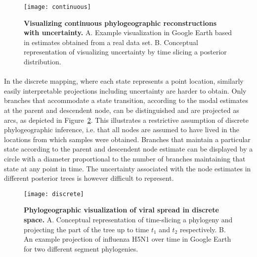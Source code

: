 \begin{figure}[h!]
\centering
\texttt{[image: continuous]}
\caption{
{ \footnotesize 
{\bf Visualizing continuous phylogeographic reconstructions with uncertainty.} 
A. Example visualization in Google Earth based in estimates obtained from a real data set. B. Conceptual representation of visualizing uncertainty by time slicing a posterior distribution.
} %
}
\label{fig:cont}
\end{figure}


\paragraph{}
In the discrete mapping, where each state represents a point location, similarly easily interpretable projections including uncertainty are harder to obtain.
Only branches that accommodate a state transition, according to the modal estimates at the parent and descendent node, can be distinguished and are projected as arcs, as depicted in Figure~\ref{fig:discrete}.
This illustrates a restrictive assumption of discrete phylogeographic inference, i.e. that all nodes are assumed to have lived in the locations from which samples were obtained.
Branches that maintain a particular state according to the parent and descendent node estimate can be displayed by a circle with a diameter proportional to the number of branches maintaining that state at any point in time.
The uncertainty associated with the node estimates in different posterior trees is however difficult to represent.

\begin{figure}[h!]
\centering
\texttt{[image: discrete]}
\caption{
{ \footnotesize 
{\bf Phylogeographic visualization of viral spread in discrete space.} 
A. Conceptual representation of time-slicing a phylogeny and projecting the part of the tree up to time $t_{1}$ and $t_{2}$ respectively. 
B. An example projection of influenza H5N1 over time in Google Earth for two different segment phylogenies. %
} %
}
\label{fig:discrete}
\end{figure}

